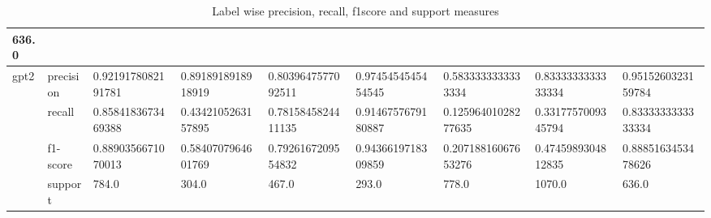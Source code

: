 \begin{landscape}
\begin{table}[]
{\begin{tabular}{@{}lllllllll@{}}
  \multicolumn{1}{l|}{636.0} \\ \midrule
\multicolumn{1}{|l|}{\multirow{4}{*}{gpt2}} &
  \multicolumn{1}{l|}{precision} &
  \multicolumn{1}{l|}{0.9219178082191781} &
  \multicolumn{1}{l|}{0.8918918918918919} &
  \multicolumn{1}{l|}{0.8039647577092511} &
  \multicolumn{1}{l|}{0.9745454545454545} &
  \multicolumn{1}{l|}{0.5833333333333334} &
  \multicolumn{1}{l|}{0.8333333333333334} &
  \multicolumn{1}{l|}{0.9515260323159784} \\ \cmidrule(l){2-9} 
\multicolumn{1}{|l|}{} &
  \multicolumn{1}{l|}{recall} &
  \multicolumn{1}{l|}{0.8584183673469388} &
  \multicolumn{1}{l|}{0.4342105263157895} &
  \multicolumn{1}{l|}{0.7815845824411135} &
  \multicolumn{1}{l|}{0.9146757679180887} &
  \multicolumn{1}{l|}{0.12596401028277635} &
  \multicolumn{1}{l|}{0.3317757009345794} &
  \multicolumn{1}{l|}{0.8333333333333334} \\ \cmidrule(l){2-9} 
\multicolumn{1}{|l|}{} &
  \multicolumn{1}{l|}{f1-score} &
  \multicolumn{1}{l|}{0.8890356671070013} &
  \multicolumn{1}{l|}{0.5840707964601769} &
  \multicolumn{1}{l|}{0.7926167209554832} &
  \multicolumn{1}{l|}{0.9436619718309859} &
  \multicolumn{1}{l|}{0.20718816067653276} &
  \multicolumn{1}{l|}{0.4745989304812835} &
  \multicolumn{1}{l|}{0.8885163453478626} \\ \cmidrule(l){2-9} 
\multicolumn{1}{|l|}{} &
  \multicolumn{1}{l|}{support} &
  \multicolumn{1}{l|}{784.0} &
  \multicolumn{1}{l|}{304.0} &
  \multicolumn{1}{l|}{467.0} &
  \multicolumn{1}{l|}{293.0} &
  \multicolumn{1}{l|}{778.0} &
  \multicolumn{1}{l|}{1070.0} &
  \multicolumn{1}{l|}{636.0} \\ \bottomrule
\end{tabular}%
}
\caption{Label wise precision, recall, f1score and support measures}
\label{tab:Per-Label-precision-recall-f-measure}
\end{table}
\end{landscape}


